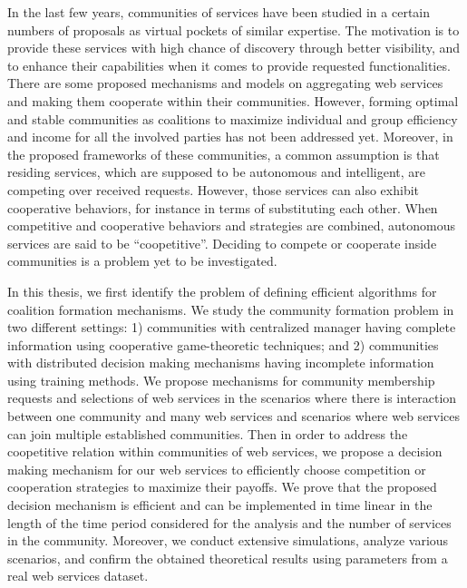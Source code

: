 
In the last few years, communities of services have been studied in a certain numbers of proposals as virtual pockets of similar expertise. The motivation is to provide these services with high chance of discovery through better visibility, and to enhance their capabilities when it comes to provide requested functionalities. There are some proposed mechanisms and models on aggregating web services and making them cooperate within their communities. However, forming optimal and stable communities as coalitions to maximize individual and group efficiency and income for all the involved parties has not been addressed yet. Moreover, in the proposed frameworks of these communities, a common assumption is that residing services, which are supposed to be autonomous and intelligent, are competing over received requests. However, those services can also exhibit cooperative behaviors, for instance in terms of substituting each other. When competitive and cooperative behaviors and strategies are combined, autonomous services are said to be ``coopetitive''. Deciding to compete or cooperate inside communities is a problem yet to be investigated.

In this thesis, we first identify the problem of defining efficient algorithms for coalition formation mechanisms. We study the community formation problem in two different settings: 1) communities with centralized manager having complete information using cooperative game-theoretic techniques; and 2) communities with distributed decision making mechanisms having incomplete information using training methods. We propose mechanisms for community membership requests and selections of web services in the scenarios where there is interaction between one community and many web services and scenarios where web services can join multiple established communities. Then in order to address the coopetitive relation within communities of web services, we propose a decision making mechanism for our web services to efficiently choose competition or cooperation strategies to maximize their payoffs. We prove that the proposed decision mechanism is efficient and can be implemented in time linear in the length of the time period considered for the analysis and the number of services in the community. Moreover, we conduct extensive simulations, analyze various scenarios, and confirm the obtained theoretical results using parameters from a real web services dataset.


